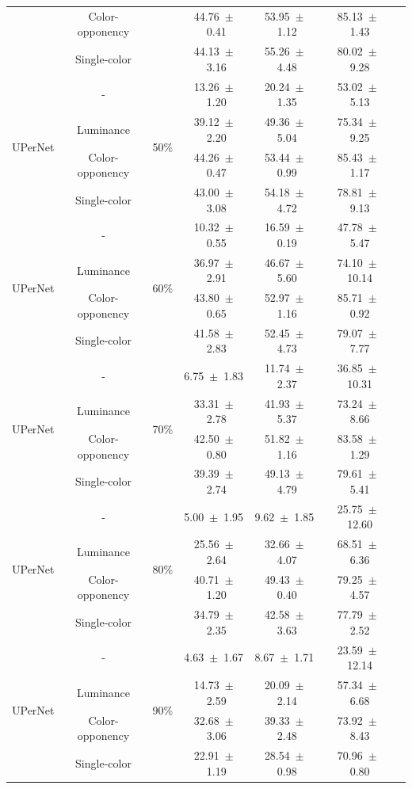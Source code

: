 \begin{table}[h]
\begin{tabular}{@{}lccc ccc@{}}
& Color-opponency & & 44.76~$\pm$~0.41 & 53.95~$\pm$~1.12 & 85.13~$\pm$~1.43 \\
& Single-color & & 44.13~$\pm$~3.16 & 55.26~$\pm$~4.48 & 80.02~$\pm$~9.28 \\
\midrule
\multirow{4}{*}{UPerNet} & - & \multirow{4}{*}{50\%} & 13.26~$\pm$~1.20 & 20.24~$\pm$~1.35 & 53.02~$\pm$~5.13 \\
& Luminance & & 39.12~$\pm$~2.20 & 49.36~$\pm$~5.04 & 75.34~$\pm$~9.25 \\
& Color-opponency & & 44.26~$\pm$~0.47 & 53.44~$\pm$~0.99 & 85.43~$\pm$~1.17 \\
& Single-color & & 43.00~$\pm$~3.08 & 54.18~$\pm$~4.72 & 78.81~$\pm$~9.13 \\
\midrule
\multirow{4}{*}{UPerNet} & - & \multirow{4}{*}{60\%} & 10.32~$\pm$~0.55 & 16.59~$\pm$~0.19 & 47.78~$\pm$~5.47 \\
& Luminance & & 36.97~$\pm$~2.91 & 46.67~$\pm$~5.60 & 74.10~$\pm$~10.14 \\
& Color-opponency & & 43.80~$\pm$~0.65 & 52.97~$\pm$~1.16 & 85.71~$\pm$~0.92 \\
& Single-color & & 41.58~$\pm$~2.83 & 52.45~$\pm$~4.73 & 79.07~$\pm$~7.77 \\
\midrule
\multirow{4}{*}{UPerNet} & - & \multirow{4}{*}{70\%} & 6.75~$\pm$~1.83 & 11.74~$\pm$~2.37 & 36.85~$\pm$~10.31 \\
& Luminance & & 33.31~$\pm$~2.78 & 41.93~$\pm$~5.37 & 73.24~$\pm$~8.66 \\
& Color-opponency & & 42.50~$\pm$~0.80 & 51.82~$\pm$~1.16 & 83.58~$\pm$~1.29 \\
& Single-color & & 39.39~$\pm$~2.74 & 49.13~$\pm$~4.79 & 79.61~$\pm$~5.41 \\
\midrule
\multirow{4}{*}{UPerNet} & - & \multirow{4}{*}{80\%} & 5.00~$\pm$~1.95 & 9.62~$\pm$~1.85 & 25.75~$\pm$~12.60 \\
& Luminance & & 25.56~$\pm$~2.64 & 32.66~$\pm$~4.07 & 68.51~$\pm$~6.36 \\
& Color-opponency & & 40.71~$\pm$~1.20 & 49.43~$\pm$~0.40 & 79.25~$\pm$~4.57 \\
& Single-color & & 34.79~$\pm$~2.35 & 42.58~$\pm$~3.63 & 77.79~$\pm$~2.52 \\
\midrule
\multirow{4}{*}{UPerNet} & - & \multirow{4}{*}{90\%} & 4.63~$\pm$~1.67 & 8.67~$\pm$~1.71 & 23.59~$\pm$~12.14 \\
& Luminance & & 14.73~$\pm$~2.59 & 20.09~$\pm$~2.14 & 57.34~$\pm$~6.68 \\
& Color-opponency & & 32.68~$\pm$~3.06 & 39.33~$\pm$~2.48 & 73.92~$\pm$~8.43 \\
& Single-color & & 22.91~$\pm$~1.19 & 28.54~$\pm$~0.98 & 70.96~$\pm$~0.80 \\
\midrule
\bottomrule
\end{tabular}
\label{tab:sparse_results_upernet_acdc_fog}
\end{table}